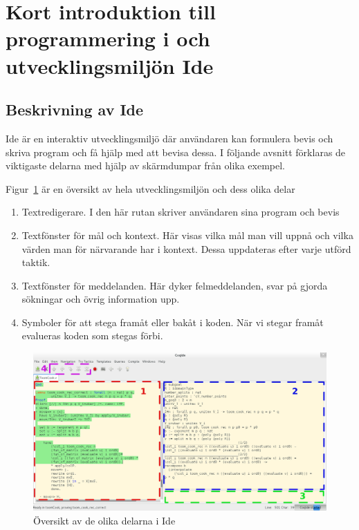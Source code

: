 \section{Kort introduktion till programmering i \coq{} och utvecklingsmiljön
\coq{} Ide}

\subsection{Beskrivning av \coq{} Ide}


\coq Ide är en interaktiv utvecklingsmiljö där användaren kan
formulera bevis och skriva program och få hjälp med att bevisa
dessa. I följande avsnitt förklaras de viktigaste delarna med
hjälp av skärmdumpar från olika exempel.


Figur~\ref{fig:oversikt} är en översikt av hela utvecklingsmiljön och dess olika delar
\begin{enumerate}
\item Textredigerare. I den här rutan skriver användaren sina program och bevis
\item Textfönster för mål och kontext. Här visas vilka mål man vill uppnå och
  vilka värden man för närvarande har i kontext. Dessa uppdateras efter varje
  utförd taktik.
\item Textfönster för meddelanden. Här dyker felmeddelanden, svar på
  gjorda sökningar och övrig information upp.
\item Symboler för att stega framåt eller bakåt i koden. När vi stegar framåt
  evalueras koden som stegas förbi.
\end{enumerate}

\filbreak

\begin{figure}[H]
  \centering
  \includegraphics[width=\textwidth]{images/Overview}
  \caption[Översikt av \coq{} Ide]
   {Översikt av de olika delarna i \coq{} Ide}
  \label{fig:oversikt}
\end{figure}

